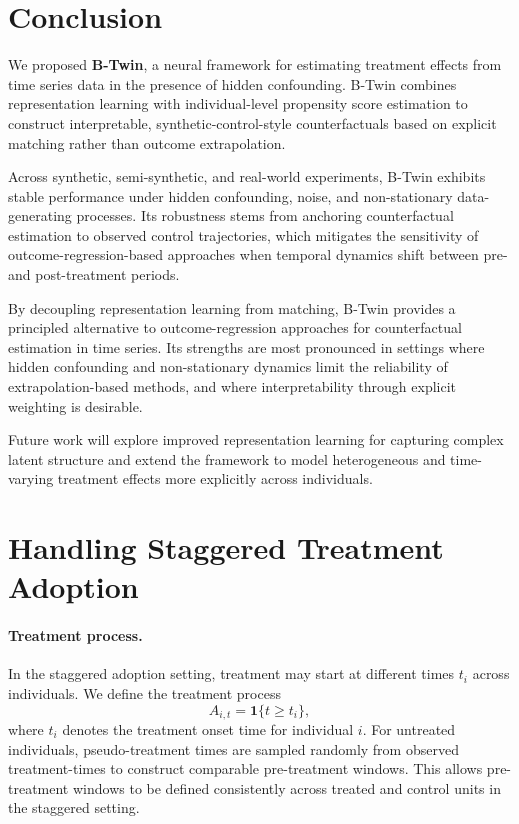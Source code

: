 \documentclass[10pt]{article} %
\begin{document}
\section{Conclusion}
We proposed \textbf{B-Twin}, a neural framework for estimating treatment effects from time series data in the presence of hidden confounding. B-Twin combines representation learning with individual-level propensity score estimation to construct interpretable, synthetic-control-style counterfactuals based on explicit matching rather than outcome extrapolation.

Across synthetic, semi-synthetic, and real-world experiments, B-Twin exhibits stable performance under hidden confounding, noise, and non-stationary data-generating processes. Its robustness stems from anchoring counterfactual estimation to observed control trajectories, which mitigates the sensitivity of outcome-regression-based approaches when temporal dynamics shift between pre- and post-treatment periods.

{By decoupling representation learning from matching, B-Twin provides a principled alternative to outcome-regression approaches for counterfactual estimation in time series. Its strengths are most pronounced in settings where hidden confounding and non-stationary dynamics limit the reliability of extrapolation-based methods, and where interpretability through explicit weighting is desirable.}

{Future work will explore improved representation learning for capturing complex latent structure and extend the framework to model heterogeneous and time-varying treatment effects more explicitly across individuals.}




\newpage
\appendix

\section{Handling Staggered Treatment Adoption}
\label{appendix:staggered}

{\paragraph{Treatment process.}
In the staggered adoption setting, treatment may start at different times $t_i$ across individuals. We define the treatment process
\[
A_{i,t} = \mathbf 1\{t \ge t_i\},
\]
where $t_i$ denotes the treatment onset time for individual $i$. For untreated individuals, pseudo-treatment times are sampled randomly from observed treatment-times to construct comparable pre-treatment windows. This allows pre-treatment windows to be defined consistently across treated and control units in the staggered setting.}
\end{document}
